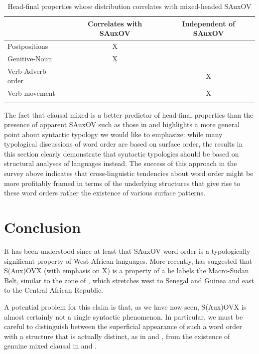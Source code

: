 \documentclass[output=paper,newtxmath,modfonts,nonflat,draftmode]{langsci/langscibook}
\begin{document}
\begin{table}
\begin{tabular}{lcc}
\lsptoprule
& {Correlates with SAuxOV} & {Independent of SAuxOV}\\
\midrule
{Postpositions} & X & \\
{Genitive-Noun} & X & \\
{Verb-Adverb order} & & X\\
{Verb movement} & & X\\	
\lspbottomrule
\end{tabular}
    \caption{Head-final properties whose distribution correlates with mixed-headed SAuxOV}\label{tab:sande:wosummary}
\end{table}

The fact that clausal mixed  is a better predictor of head-final properties than the presence of apparent SAuxOV such as those in  and  highlights a more general point about syntactic typology we would like to emphasize: while many typological discussions of word order are based on surface order, the results in this section clearly demonstrate that syntactic typologies should be based on structural analyses of languages instead. The success of this approach in the survey above indicates that cross-linguistic tendencies about word order might be more profitably framed in terms of the underlying structures that give rise to these word orders rather the existence of various surface patterns.

\section{Conclusion}\label{sec:conclusion}
It has been understood since at least \citet{heine76} that SAuxOV word order is a typologically significant property of West African languages. More recently, \citet{guld08,guld11} has suggested that S(Aux)OVX (with emphasis on X) is a property of a  he labels the Macro-Sudan Belt, similar to the  zone of \citet{clements08}, which stretches west to Senegal and Guinea and east to the Central African Republic.  

A potential problem for this claim is that, as we have now seen, S(Aux)OVX is almost certainly not a single syntactic phenomenon. In particular, we must be careful to distinguish between the superficial appearance of such a word order with a structure that is actually distinct, as in  and , from the existence of genuine mixed clausal  in  and .
\end{document}

